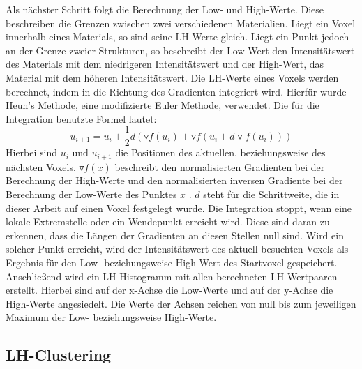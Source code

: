 Als nächster Schritt folgt die Berechnung der Low- und High-Werte. Diese beschreiben die Grenzen zwischen zwei verschiedenen Materialien. Liegt ein Voxel innerhalb eines Materials, so sind seine LH-Werte gleich. Liegt ein Punkt jedoch an der Grenze zweier Strukturen, so beschreibt der Low-Wert den Intensitätswert des Materials mit dem niedrigeren Intensitätswert und der High-Wert, das Material mit dem höheren Intensitätswert. Die LH-Werte eines Voxels werden berechnet, indem in die Richtung des Gradienten integriert wird. Hierfür wurde Heun's Methode, eine modifizierte Euler Methode, verwendet. Die für die Integration benutzte Formel lautet:
\begin{equation}
	u_{i+1} = u_{i} + \frac{1}{2}d(\triangledown f (u_{i}) + \triangledown f(u_{i}+d \triangledown f(u_{i}))) 
\end{equation}
Hierbei sind $u_{i}$ und $u_{i+1}$ die Positionen des aktuellen, beziehungsweise des nächsten Voxels. $\triangledown f(x)$ beschreibt den normalisierten Gradienten bei der Berechnung der High-Werte und den normalisierten inversen Gradiente bei der Berechnung der Low-Werte des Punktes $x$ . $d$ steht für die Schrittweite, die in dieser Arbeit auf einen Voxel festgelegt wurde.
\newline
Die Integration stoppt, wenn eine lokale Extremstelle oder ein Wendepunkt erreicht wird. Diese sind daran zu erkennen, dass die Längen der Gradienten an diesen Stellen null sind.
\newline
Wird ein solcher Punkt erreicht, wird der Intensitätswert des aktuell besuchten Voxels als Ergebnis für den Low- beziehungsweise High-Wert des Startvoxel gespeichert.
\newline
Anschließend wird ein LH-Histogramm mit allen berechneten LH-Wertpaaren erstellt. Hierbei sind auf der x-Achse die Low-Werte und auf der y-Achse die High-Werte angesiedelt. Die Werte der Achsen reichen von null bis zum jeweiligen Maximum der Low- beziehungsweise High-Werte.



\subsection{LH-Clustering}

